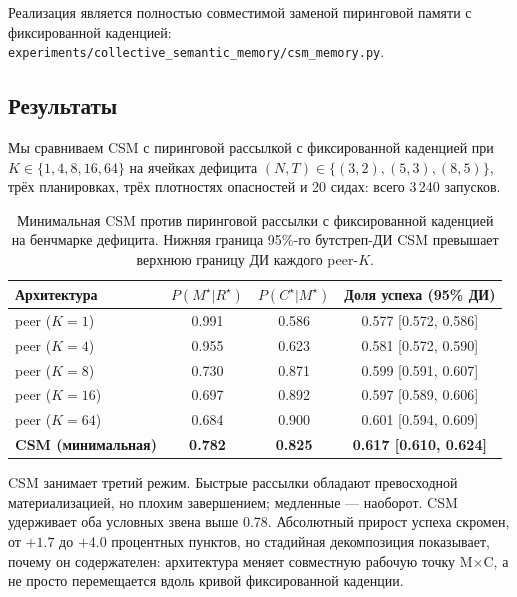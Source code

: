 \documentclass{article}
\newcommand{\method}[1]{\texttt{#1}}
\begin{document}
Реализация является полностью совместимой заменой пиринговой памяти с
фиксированной каденцией:
\method{experiments/collective\_semantic\_memory/csm\_memory.py}.

\subsection{Результаты}

Мы сравниваем CSM с пиринговой рассылкой с фиксированной каденцией при
$K \in \{1,4,8,16,64\}$ на ячейках дефицита
$(N,T){\in}\{(3,2),(5,3),(8,5)\}$, трёх планировках, трёх плотностях
опасностей и 20 сидах: всего 3\,240 запусков.

\begin{table}[ht]
\caption{Минимальная CSM против пиринговой рассылки с фиксированной каденцией на бенчмарке дефицита. Нижняя граница 95\%-го бутстреп-ДИ CSM превышает верхнюю границу ДИ каждого peer-$K$.}
\label{p4:tab:csm-results}
\centering
\small
\begin{tabular}{l c c c}
\toprule
Архитектура & $P(M^\star|R^\star)$ & $P(C^\star|M^\star)$ & Доля успеха (95\% ДИ) \\
\midrule
peer ($K{=}1$)  & 0.991 & 0.586 & 0.577 [0.572, 0.586] \\
peer ($K{=}4$)  & 0.955 & 0.623 & 0.581 [0.572, 0.590] \\
peer ($K{=}8$)  & 0.730 & 0.871 & 0.599 [0.591, 0.607] \\
peer ($K{=}16$) & 0.697 & 0.892 & 0.597 [0.589, 0.606] \\
peer ($K{=}64$) & 0.684 & 0.900 & 0.601 [0.594, 0.609] \\
\textbf{CSM (минимальная)} & \textbf{0.782} & \textbf{0.825} & \textbf{0.617 [0.610, 0.624]} \\
\bottomrule
\end{tabular}
\end{table}

CSM занимает третий режим. Быстрые рассылки обладают превосходной
материализацией, но плохим завершением; медленные --- наоборот. CSM
удерживает оба условных звена выше 0.78. Абсолютный прирост успеха
скромен, от $+1.7$ до $+4.0$ процентных пунктов, но стадийная
декомпозиция показывает, почему он содержателен: архитектура меняет
совместную рабочую точку M$\times$C, а не просто перемещается вдоль
кривой фиксированной каденции.
\end{document}
